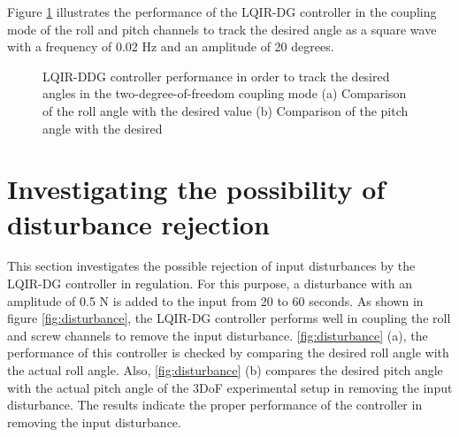 \documentclass[3p,times]{elsarticle}
\begin{document}
Figure \ref{fig:square} illustrates the performance of the LQIR-DG controller in the coupling mode of the roll and pitch channels to track the desired angle as a square wave with a frequency of 0.02 Hz and an amplitude of 20 degrees.

\begin{figure}[!ht]
	\centering
	\caption{LQIR-DDG controller performance in order to track the desired angles in the two-degree-of-freedom coupling mode (a) Comparison of the roll angle with the desired value (b) Comparison of the pitch angle with the desired}
	\label{fig:square}
\end{figure}

\section{Investigating the possibility of disturbance rejection}

This section investigates the possible rejection of input disturbances by the LQIR-DG controller in regulation. For this purpose, a disturbance with an amplitude of 0.5 N is added to the input from 20 to 60 seconds. As shown in figure \ref{fig:disturbance}, the LQIR-DG controller performs well in coupling the roll and screw channels to remove the input disturbance. \ref{fig:disturbance} (a), the performance of this controller is checked by comparing the desired roll angle with the actual roll angle. Also, \ref{fig:disturbance}  (b) compares the desired pitch angle with the actual pitch angle of the 3DoF experimental setup in removing the input disturbance. The results indicate the proper performance of the controller in removing the input disturbance.
\end{document}
